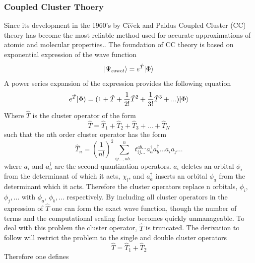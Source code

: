     \subsubsection{Coupled Cluster Thoery}
      Since its development in the 1960's by {\u C}{\'i}{\u v}ek and Paldus \cite{Civek 1966, Civek 1969, Civek 1971} Coupled Cluster (CC) theory has become the most reliable method used for accurate approximations of atomic and molecular properties.\cite{Crawford 2000}.  The foundation of CC theory is based on exponential expression of the wave function
        \begin{equation}
          | \Psi_{exact} \rangle = e^{\hat{T}}| \Phi \rangle
        \end{equation}
      A power series expansion of the expression provides the following equation
        \begin{equation}
          e^{\hat{T}}| \Phi \rangle = (1 + \hat{T} + \frac{1}{2!} \hat{T}^2 + \frac{1}{3!} \hat{T}^3 + ...) | \Phi \rangle
        \end{equation}
      Where $\hat{T}$ is the cluster operator of the form 
        \begin{equation}
          \hat{T} = \hat{T}_1 + \hat{T}_2 + \hat{T}_3 + ... + \hat{T}_N
        \end{equation}
      such that the nth order cluster operator has the form 
        \begin{equation}
          \hat{T}_n = \left(\frac{1}{n!}\right)^2 \sum_{ij\dots,ab\dots}^{n} t_{ij\dots}^{ab\dots} a^\dagger_a a^\dagger_b \dots a_i a_j \dots
        \end{equation}
      where $a_i$ and $a^\dagger_a$ are the second-quantization operators.  $a_i$ deletes an orbital $\phi_i$ from the determinant of which it acts, $\chi_l$, and $a^\dagger_a$ inserts an orbital $\phi_a$ from the determinant which it acts.  Therefore the cluster operators replace n orbitals, $\phi_i$, $\phi_j, \dots$ with $\phi_a$, $\phi_b,\dots$ respectively.\cite{Crawford 2000, Bartlett 2007} 
      By including all cluster operators in the expression of $\hat{T}$ one can form the exact wave function, though the number of terms and the computational scaling factor becomes quickly unmanageable.  To deal with this problem the cluster operator, $\hat{T}$ is truncated.  The derivation to follow will restrict the problem to the single and double cluster operators
        \begin{equation}
          \hat{T} = \hat{T}_1 + \hat{T}_2
        \end{equation}
      Therefore one defines
